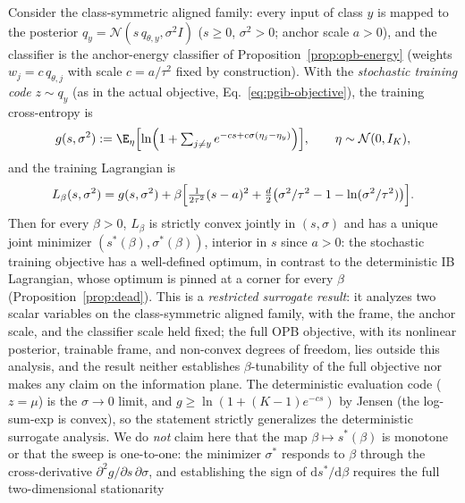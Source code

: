 \begin{proposition}
\label{prop:opb-sweep}
Consider the class-symmetric aligned family: every input of class $y$ is mapped to the
posterior $q_y = \mathcal{N}(s\,q_{\theta,y}, \sigma^2 I)$ ($s \ge 0$, $\sigma^2 > 0$;
anchor scale $a > 0$), and the classifier is the anchor-energy classifier of
Proposition~\ref{prop:opb-energy} (weights $w_j = c\,q_{\theta,j}$ with scale
$c = a/\tau^2$ fixed by construction). With the \emph{stochastic training code}
$z \sim q_y$ (as in the actual objective, Eq.~\eqref{eq:pgib-objective}), the
training cross-entropy is
\begin{equation}
g(s, \sigma^2) := \E_\eta\Bigl[
\ln\Bigl(1 + \textstyle\sum_{j \ne y} e^{-cs + c\sigma(\eta_j - \eta_y)}\Bigr)
\Bigr],
\qquad \eta \sim \mathcal{N}(0, I_K),
\label{eq:opb-ce-train}
\end{equation}
and the training Lagrangian is
\begin{equation}
L_\beta(s, \sigma^2) = g(s, \sigma^2)
+ \beta\Bigl[
\tfrac{1}{2\tau^2}(s-a)^2
+ \tfrac{d}{2}\bigl(\sigma^2/\tau^2 - 1 - \ln(\sigma^2/\tau^2)\bigr)
\Bigr].
\label{eq:opb-lag-train}
\end{equation}
Then for every $\beta > 0$, $L_\beta$ is strictly convex jointly in $(s, \sigma)$ and
has a unique joint minimizer $(s^*(\beta), \sigma^*(\beta))$, interior in $s$ since
$a > 0$: the stochastic training objective has a well-defined optimum, in contrast to
the deterministic IB Lagrangian, whose optimum is pinned at a corner for every $\beta$
(Proposition~\ref{prop:dead}). This is a \emph{restricted surrogate result}: it
analyzes two scalar variables on the class-symmetric aligned family, with the frame,
the anchor scale, and the classifier scale held fixed; the full OPB objective, with
its nonlinear posterior, trainable frame, and non-convex degrees of freedom, lies
outside this analysis, and the result neither establishes $\beta$-tunability of the
full objective nor makes any claim on the information plane.
The deterministic evaluation code ($z = \mu$) is the $\sigma \to 0$ limit, and
$g \ge \ln(1 + (K-1)e^{-cs})$ by Jensen (the log-sum-exp is convex), so the statement
strictly generalizes the deterministic surrogate analysis. We do \emph{not} claim here
that the map $\beta \mapsto s^*(\beta)$ is monotone or that the sweep is one-to-one:
the minimizer $\sigma^*$ responds to $\beta$ through the cross-derivative
$\partial^2 g/\partial s\,\partial\sigma$, and establishing the sign of
$\mathrm{d}s^*/\mathrm{d}\beta$ requires the full two-dimensional stationarity

\end{proposition}
